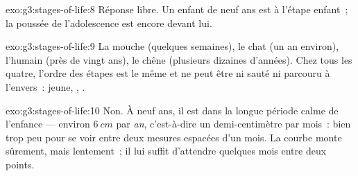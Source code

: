 \begin{solution}{exo:g3:stages-of-life:8}
Réponse libre. Un enfant de neuf ans est à l'étape enfant~; la
poussée de l'adolescence est encore devant lui.
\end{solution}

\begin{solution}{exo:g3:stages-of-life:9}
La mouche (quelques semaines), le chat (un an environ), l'humain
(près de vingt ans), le chêne (plusieurs dizaines d'années). Chez
tous les quatre, l'ordre des étapes est le même et ne peut être ni
sauté ni parcouru à l'envers~: jeune, , .
\end{solution}

\begin{solution}{exo:g3:stages-of-life:10}
Non. À neuf ans, il est dans la longue période calme de l'enfance
--- environ $\qty{6}{cm}$ par \emph{an}, c'est-à-dire un demi-centimètre
par mois~: bien trop peu pour se voir entre deux mesures espacées
d'un mois. La courbe monte sûrement, mais lentement~; il lui suffit
d'attendre quelques mois entre deux points.
\end{solution}
